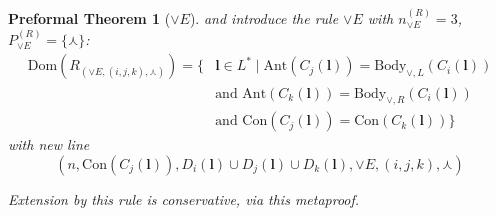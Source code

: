 \documentclass[oneside, 12pt]{book}
\theoremstyle{break}
\newtheorem{preformal definition}[definition]{Preformal Definition}
\newtheorem{preformal theorem}[theorem]{Preformal Theorem}
\newcommand{\bv}[1]{\boldsymbol{#1}}
\begin{document}
\begin{preformal theorem}[$\lor E$]
			and introduce the rule $\lor E$ with $n_{\lor E}^{(R)} = 3$, $P_{\lor E}^{(R)} = \{\curlywedge\}$:
			\begin{align*}
				\text{Dom}(R_{(\lor E, (i, j, k), \curlywedge)}) = \{&\bv{l} \in L^* \mid \text{Ant}(C_j(\bv{l})) = \text{Body}_{\lor, L}(C_i(\bv{l}))\\ &\text{and } \text{Ant}(C_k(\bv{l})) = \text{Body}_{\lor, R}(C_i(\bv{l}))\\
				&\text{and } \text{Con}(C_j(\bv{l})) = \text{Con}(C_k(\bv{l}))\}
			\end{align*}
			with new line
			\begin{equation*}
				(n, \text{Con}(C_j(\bv{l})), D_i(\bv{l}) \cup D_j(\bv{l}) \cup D_k(\bv{l}), \lor E, (i, j, k), \curlywedge)
			\end{equation*}
			
			Extension by this rule is conservative, via this metaproof.
		\end{preformal theorem}
		
\end{document}
